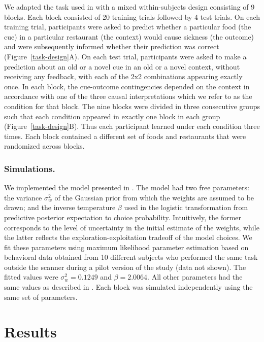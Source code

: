 \documentclass[10pt,letterpaper]{article}
\begin{document}
We adapted the task used in  with a mixed within-subjects design consisting of 9 blocks. Each block consisted of 20 training trials followed by 4 test trials. On each training trial, participants were asked to predict whether a particular food (the cue) in a particular restaurant (the context) would cause sickness (the outcome) and were subsequently informed whether their prediction was correct (Figure~\ref{task-design}A). On each test trial, participants were asked to make a prediction about an old or a novel cue in an old or a novel context, without receiving any feedback, with each of the 2x2 combinations appearing exactly once. In each block, the cue-outcome contingencies depended on the context in accordance with one of the three causal interpretations which we refer to as the condition for that block. The nine blocks were divided in three consecutive groups such that each condition appeared in exactly one block in each group (Figure~\ref{task-design}B). Thus each participant learned under each condition three times. Each block contained a different set of foods and restaurants that were randomized across blocks.
\\

\subsubsection{Simulations.} 

We implemented the model presented in . The model had two free parameters: the variance $\sigma^2_w$ of the Gaussian prior from which the weights are assumed to be drawn; and the inverse temperature $\beta$ used in the logistic transformation from predictive posterior expectation to choice probability. Intuitively, the former corresponds to the level of uncertainty in the initial estimate of the weights, while the latter reflects the exploration-exploitation tradeoff of the model choices. We fit these parameters using maximum likelihood parameter estimation based on behavioral data obtained from 10 different subjects who performed the same task outside the scanner during a pilot version of the study (data not shown). The fitted values were $\sigma^2_w = 0.1249$ and $\beta = 2.0064$. All other parameters had the same values as described in . Each block was simulated independently using the same set of parameters.


\section{Results}
\end{document}
